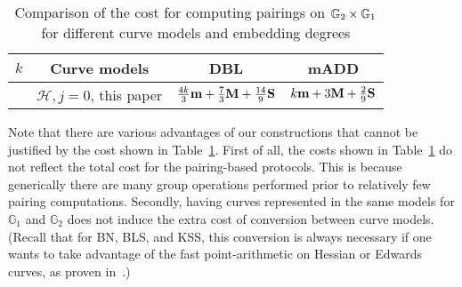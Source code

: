 \begin{table}[h]
\centering
\caption{Comparison of the cost for computing pairings on $\mathbb{G}_{2} \times \mathbb{G}_{1}$ for different curve models and embedding degrees}

\begin{tabular}{ l | l | l | l}
\hline
\multicolumn{1}{c|}{$k$}
&\multicolumn{1}{c|}{Curve models}	&\multicolumn{1}{c|}{DBL}	&\multicolumn{1}{c}{mADD}	\\
\hline
& $\mathcal{H},j=0$, this paper
& $\frac{4k}{3}\textbf{m} + \frac{7}{3}\textbf{M} + \frac{14}{9}\textbf{S} $
& $k\textbf{m} + 3\textbf{M} + \frac{2}{9}\textbf{S}$ \\
\hline
\end{tabular}
\label{tbl-cmp}


\end{table}

Note that there are various advantages of our constructions that cannot be justified by the cost shown in Table~\ref{tbl-cmp}.
First of all, the costs shown in Table~\ref{tbl-cmp} do not reflect the total cost for the pairing-based protocols.
This is because generically there are many group operations performed prior to relatively few pairing computations.
Secondly, having curves represented in the same models for $\mathbb{G}_1$ and $\mathbb{G}_2$ does not induce the extra cost of conversion between curve models.
(Recall that for BN, BLS, and KSS, this conversion is always necessary if one wants to take advantage of
the fast point-arithmetic on Hessian or Edwards curves, as proven in~\cite{2013/bos-pairing}.)


